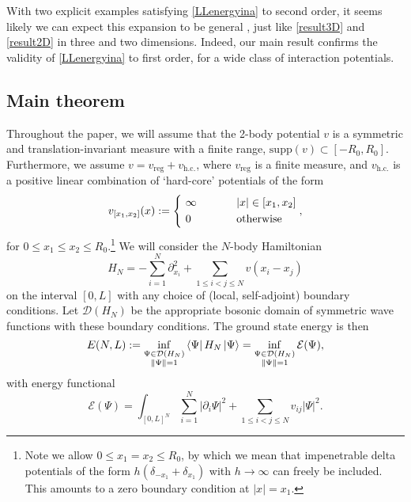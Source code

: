 \documentclass[a4paper,11pt]{article}
\newcommand{\supp}{\text{supp}}
\newcommand{\abs}[1]{\left\lvert #1 \right\rvert}
\newcommand{\dom}[1]{\mathcal D\left(#1\right)}
\numberwithin{equation}{section}
\begin{document}
With two explicit examples satisfying \eqref{LLenergyina} to second order, it seems likely we can expect this expansion to be general \cite{astrakharchik2010low}, just like \eqref{result3D} and \eqref{result2D} in three and two dimensions. Indeed, our main result confirms the validity of \eqref{LLenergyina} to first order, for a wide class of interaction potentials.

\subsection{Main theorem}
\label{secMain}
Throughout the paper, we will assume that the 2-body potential $v$ is a symmetric and translation-invariant measure with a finite range, $\supp(v)\subset[-R_0,R_0]$. Furthermore, we assume $ v=v_{\text{reg}}+v_{\text{h.c.}}$, where $ v_{\text{reg}}$ is a finite measure, and $ v_{\text{h.c.}} $ is a positive linear combination of `hard-core' potentials of the form 
\begin{equation}
v_{[x_1,x_2]}(x):=\begin{cases*}
\ \infty& \phantom{when} $|x|\in [x_1,x_2]$\\
\ 0 & \phantom{when} \text{otherwise}
\end{cases*},
\end{equation}
for $0\leq x_1\leq x_2\leq R_0$.\footnote{Note we allow $0\leq x_1=x_2\leq R_0$, by which we mean that impenetrable delta potentials of the form $h(\delta_{-x_1}+\delta_{x_1})$ with $h\to\infty$ can freely be included. This amounts to a zero boundary condition at $|x|=x_1$.}
We will consider the $N$-body Hamiltonian 
\begin{equation}
\label{H_N}
H_N=-\sum^N_{i=1}\partial^2_{x_i}+\sum_{1\leq i<j\leq N}v(x_i-x_j)
\end{equation}
on the interval $[0,L]$ with any choice of (local, self-adjoint) boundary conditions. Let $\dom{H_N}$ be the appropriate bosonic domain of symmetric wave functions with these boundary conditions. The ground state energy is then
\begin{equation}
\label{vari}
E(N,L):=\inf_{\substack{\Psi\in\dom{H_N}\\\|\Psi\|=1}}\bra{\Psi}H_N\ket{\Psi}=\inf_{\substack{\Psi\in\dom{H_N}\\\|\Psi\|=1}}\mathcal{E}(\Psi),
\end{equation}
with energy functional
\begin{equation}
\mathcal{E}(\Psi)=\int_{[0,L]^N}\sum_{i=1}^{N}\abs{\partial_i\Psi}^2+\sum_{1\leq i<j\leq N}v_{ij}\abs{\Psi}^2.
\end{equation}
\end{document}

